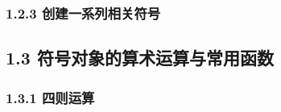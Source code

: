 \begin{Shaded}
\begin{Highlighting}[]
\end{Highlighting}
\end{Shaded}

\subsubsection{1.2.3
创建一系列相关符号}\label{ux521bux5efaux4e00ux7cfbux5217ux76f8ux5173ux7b26ux53f7}

\begin{Shaded}
\begin{Highlighting}[]
\OperatorTok{=} 
\OperatorTok{=}\SpecialCharTok{\{}\OperatorTok{+}\SpecialCharTok{\}}\SpecialStringTok{\textquotesingle{}}\NormalTok{)}

\OperatorTok{=}\NormalTok{ [sp.Symbol(}\SpecialCharTok{\{}\OperatorTok{+}\SpecialCharTok{\}}\SpecialStringTok{\textquotesingle{}}\NormalTok{) } \NormalTok{(}\NormalTok{)]}
\end{Highlighting}
\end{Shaded}

\begin{Shaded}
\begin{Highlighting}[]
\NormalTok{[x\_1, x\_2, x\_3]}
\end{Highlighting}
\end{Shaded}

\subsection{1.3
符号对象的算术运算与常用函数}\label{ux7b26ux53f7ux5bf9ux8c61ux7684ux7b97ux672fux8fd0ux7b97ux4e0eux5e38ux7528ux51fdux6570}

\subsubsection{1.3.1 四则运算}\label{ux56dbux5219ux8fd0ux7b97-1}

\begin{Shaded}
\begin{Highlighting}[]
\OperatorTok{=}\NormalTok{)}
\OperatorTok{+}
\OperatorTok{{-}}
\OperatorTok{*}
\OperatorTok{/}
\end{Highlighting}
\end{Shaded}

